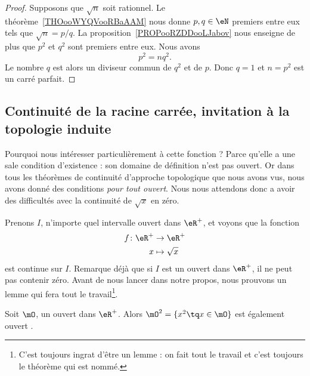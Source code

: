 \begin{proof}
    Supposons que \( \sqrt{n}\) soit rationnel. Le théorème~\ref{THOooWYQVooRBaAAM} nous donne \( p,q\in \eN\) premiers entre eux tels que \( \sqrt{n}=p/q\). La proposition~\ref{PROPooRZDDooLJabov} nous enseigne de plus que \( p^2\) et \( q^2\) sont premiers entre eux. Nous avons
    \begin{equation}
        p^2=nq^2.
    \end{equation}
    Le nombre $q$ est alors un diviseur commun de \( q^2\) et de \( p\). Donc \( q=1\) et \( n=p^2\) est un carré parfait.
\end{proof}

\subsection{Continuité de la racine carrée, invitation à la topologie induite}

Pourquoi nous intéresser particulièrement à cette fonction ? Parce qu'elle a une sale condition d'existence : son domaine de définition n'est pas ouvert. Or dans tous les théorèmes de continuité d'approche topologique que nous avons vus, nous avons donné des conditions \emph{pour tout ouvert}. Nous nous attendons donc a avoir des difficultés avec la continuité de $\sqrt{x}$ en zéro.

Prenons $I$, n'importe quel intervalle ouvert dans $\eR^+$, et voyons que la fonction
\begin{equation}
\begin{aligned}
 f\colon \eR^+&\to \eR^+ \\
   x&\mapsto \sqrt{x}
\end{aligned}
\end{equation}
est continue sur $I$. Remarque déjà que si $I$ est un ouvert dans $\eR^+$, il ne peut pas contenir zéro. Avant de nous lancer dans notre propos, nous prouvons un lemme qui fera tout le travail\footnote{C'est toujours ingrat d'être un lemme : on fait tout le travail et c'est toujours le théorème qui est nommé.}.

\begin{lemma}
Soit $\mO$, un ouvert dans $\eR^+$. Alors $\mO^2=\{ x^2\tq x\in\mO \}$ est également ouvert .
\end{lemma}

